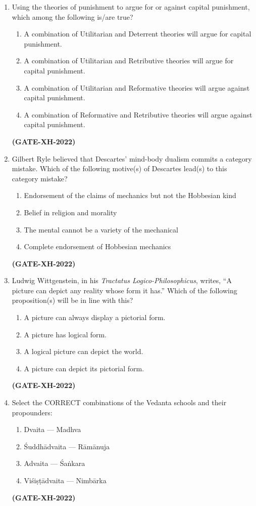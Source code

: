 \documentclass[journal]{IEEEtran}
\begin{document}
\begin{enumerate}
\item Using the theories of punishment to argue for or against capital punishment, which among the following is/are true?
\begin{enumerate}
\item A combination of Utilitarian and Deterrent theories will argue for capital punishment.  
\item A combination of Utilitarian and Retributive theories will argue for capital punishment.  
\item A combination of Utilitarian and Reformative theories will argue against capital punishment.  
\item A combination of Reformative and Retributive theories will argue against capital punishment.  
\end{enumerate}
\hfill\textbf{(GATE-XH-2022)}

\item Gilbert Ryle believed that Descartes’ mind-body dualism commits a category mistake. Which of the following motive(s) of Descartes lead(s) to this category mistake?
\begin{enumerate}
\item Endorsement of the claims of mechanics but not the Hobbesian kind  
\item Belief in religion and morality  
\item The mental cannot be a variety of the mechanical  
\item Complete endorsement of Hobbesian mechanics  
\end{enumerate}
\hfill\textbf{(GATE-XH-2022)}

\item Ludwig Wittgenstein, in his \textit{Tractatus Logico-Philosophicus}, writes, “A picture can depict any reality whose form it has.” Which of the following proposition(s) will be in line with this?
\begin{enumerate}
\item A picture can always display a pictorial form.  
\item A picture has logical form.  
\item A logical picture can depict the world.  
\item A picture can depict its pictorial form.  
\end{enumerate}
\hfill\textbf{(GATE-XH-2022)}

\item Select the CORRECT combinations of the Vedanta schools and their propounders:
\begin{multicols}{2}
\begin{enumerate}
\item Dvaita --- Madhva  
\item Śuddhādvaita --- Rāmānuja  
\item Advaita --- Śaṅkara  
\item Viśiṣṭādvaita --- Nimbārka  
\end{enumerate}
\end{multicols}
\hfill\textbf{(GATE-XH-2022)}


\end{enumerate}
\end{document}

